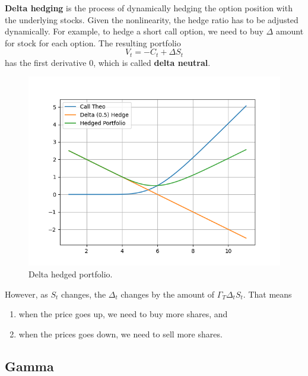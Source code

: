 \documentclass{article}
\begin{document}
    \begin{definition}
      \textbf{Delta hedging} is the process of dynamically hedging the option position with the underlying stocks. Given the nonlinearity, the hedge ratio has to be adjusted dynamically. For example, to hedge a short call option, we need to buy $\Delta$ amount for stock for each option. The resulting portfolio 
      \begin{equation}
        V_t = -C_t + \Delta S_t
      \end{equation}
      has the first derivative $0$, which is called \textbf{delta neutral}. 

      \begin{figure}[H]
        \centering 
        \includegraphics[scale=0.4]{img/delta_hedge.png}
        \caption{Delta hedged portfolio.} 
        \label{fig:delta_hedge}
      \end{figure}

      However, as $S_t$ changes, the $\Delta_t$ changes by the amount of $\Gamma_T \Delta_t S_t$. That means 
      \begin{enumerate}
        \item when the price goes up, we need to buy more shares, and 
        \item when the prices goes down, we need to sell more shares. 
      \end{enumerate}
    \end{definition}

  \subsection{Gamma}
\end{document}
